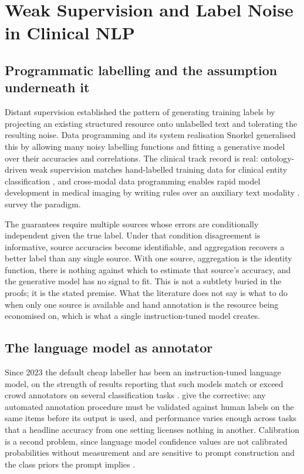\section{Weak Supervision and Label Noise in Clinical NLP}
\label{sec:lit-weak}

\subsection{Programmatic labelling and the assumption underneath it}

Distant supervision \citep{mintz2009distant} established the pattern of generating training
labels by projecting an existing structured resource onto unlabelled text and tolerating the
resulting noise. Data programming \citep{ratner2016dataprogramming} and its system
realisation Snorkel \citep{ratner2017snorkel} generalised this by allowing many noisy
labelling functions and fitting a generative model over their accuracies and correlations.
The clinical track record is real: ontology-driven weak supervision matches hand-labelled
training data for clinical entity classification \citep{fries2021trove}, and cross-modal data
programming enables rapid model development in medical imaging by writing rules over an
auxiliary text modality \citep{dunnmon2020crossmodal}. \citet{zhang2022wssurvey} survey the
paradigm.

The guarantees require multiple sources whose errors are conditionally independent given the
true label. Under that condition disagreement is informative, source accuracies become
identifiable, and aggregation recovers a better label than any single source. With one
source, aggregation is the identity function, there is nothing against which to estimate that
source's accuracy, and the generative model has no signal to fit. This is not a subtlety
buried in the proofs; it is the stated premise. What the literature does not say is what to
do when only one source is available and hand annotation is the resource being economised on,
which is what a single instruction-tuned model creates.

\subsection{The language model as annotator}

Since 2023 the default cheap labeller has been an instruction-tuned language model, on the
strength of results reporting that such models match or exceed crowd annotators on several
classification tasks \citep{gilardi2023chatgpt}. \citet{pangakis2023validation} give the
corrective: any automated annotation procedure must be validated against human labels on the
same items before its output is used, and performance varies enough across tasks that a
headline accuracy from one setting licenses nothing in another. Calibration is a second
problem, since language model confidence values are not calibrated probabilities without
measurement \citep{guo2017calibration} and are sensitive to prompt construction and the class
priors the prompt implies \citep{zhao2021calibrate}.

